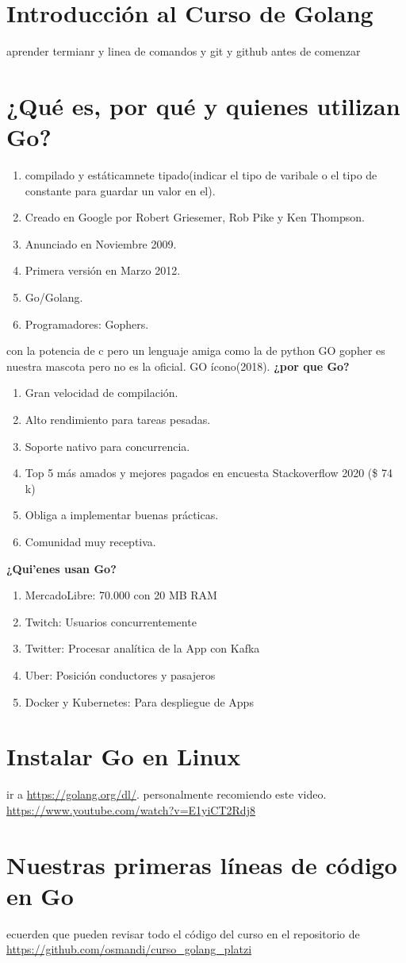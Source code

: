 \documentclass{article}
\begin{document}
    \section{Introducción al Curso de Golang}
    aprender  termianr y linea de comandos y git y github antes de comenzar
    \section{¿Qué es, por qué y quienes utilizan Go?}
    \begin{enumerate}
        \item compilado y estáticamnete tipado(indicar el tipo de varibale o el tipo de constante para guardar un valor en el). 
        \item Creado en Google por Robert
        Griesemer, Rob Pike y Ken Thompson.
        \item Anunciado en Noviembre 2009.
        \item Primera versión en Marzo 2012.
        \item Go/Golang.
        \item Programadores: Gophers.
    \end{enumerate}
    con la potencia de c pero un lenguaje amiga como la de python
    GO gopher es nuestra mascota pero no es la oficial.
    GO ícono(2018). 
    \textbf{¿por que Go?}
    \begin{enumerate}
        \item Gran velocidad de compilación.
        \item Alto rendimiento para tareas pesadas.
        \item Soporte nativo para concurrencia.
        \item Top 5 más amados y mejores pagados
        en encuesta Stackoverflow 2020 (\$ 74 k)
        \item Obliga a implementar buenas prácticas.
        \item Comunidad muy receptiva.
    \end{enumerate}
    \textbf{¿Qui'enes usan Go?}
    \begin{enumerate}
        \item MercadoLibre: 70.000 con 20 MB RAM
        \item Twitch: Usuarios concurrentemente
        \item Twitter: Procesar analítica de la App con Kafka
        \item Uber: Posición conductores y pasajeros
        \item Docker y Kubernetes: Para despliegue de Apps
    \end{enumerate}
    \section{Instalar Go en Linux}
    ir a \url{https://golang.org/dl/}. personalmente recomiendo este video.
    \url{https://www.youtube.com/watch?v=E1yiCT2Rdj8}
    \section{Nuestras primeras líneas de código en Go}
    ecuerden que pueden revisar todo el código del curso en el repositorio de 
    \url{https://github.com/osmandi/curso_golang_platzi}
    
\end{document}
